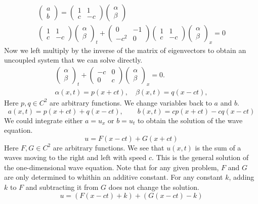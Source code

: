 \begin{gather*}
  \begin{pmatrix} a \\ b \end{pmatrix}
  =
  \begin{pmatrix} 1 & 1 \\ c & -c \end{pmatrix}
  \begin{pmatrix} \alpha \\ \beta \end{pmatrix}
  \\
  \begin{pmatrix} 1 & 1 \\ c & -c \end{pmatrix}
  \begin{pmatrix} \alpha \\ \beta \end{pmatrix}_t + 
  \begin{pmatrix} 0 & -1 \\ -c^2 & 0 \end{pmatrix}
  \begin{pmatrix} 1 & 1 \\ c & -c \end{pmatrix}
  \begin{pmatrix} \alpha \\ \beta \end{pmatrix}_x = 0
\end{gather*}
Now we left multiply by the inverse of the matrix of eigenvectors to obtain
an uncoupled system that we can solve directly.
\begin{gather*}
  \begin{pmatrix} \alpha \\ \beta  \end{pmatrix}_t + 
  \begin{pmatrix} -c & 0 \\ 0 & c \end{pmatrix}
  \begin{pmatrix} \alpha \\ \beta \end{pmatrix}_x = 0.
  \\
  \alpha(x,t) = p(x + c t), \quad \beta(x,t) = q(x - c t),
\end{gather*}
Here $p,q \in C^2$ are arbitrary functions.
We change variables back to $a$ and $b$.
\[
a(x,t) = p(x + c t) + q(x - c t), \qquad
b(x,t) = c p(x + c t) - c q(x - c t)
\]
We could integrate either $a = u_x$ or  $b = u_t$ to obtain the solution of 
the wave equation.
\[
\boxed{
  u = F(x - c t) + G(x + c t)
  }
\]
Here $F,G \in C^2$ are arbitrary functions.  
We see that $u(x,t)$ is the sum of a waves moving to the right and left
with speed $c$.  This is the general solution 
of the one-dimensional wave equation.  Note that for any given
problem, $F$ and $G$ are only determined to whithin an additive
constant.  For any constant $k$, adding $k$ to $F$ and subtracting
it from $G$ does not change the solution.
\[
u = \left( F(x - c t) + k \right) + \left( G(x - c t) - k \right)
\]









